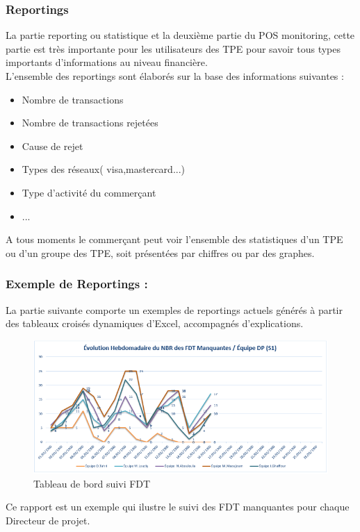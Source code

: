 \subsubsection{Reportings}
La partie reporting ou statistique et la deuxième partie du POS monitoring, cette partie est très importante pour les utilisateurs des TPE pour savoir tous types importants d'informations au niveau financière.\\

L’ensemble des reportings sont élaborés sur la base des informations suivantes :
\begin{itemize}[label=\textbullet]
\item Nombre de transactions 
\item Nombre de transactions rejetées
\item Cause de rejet 
\item Types des réseaux( visa,mastercard...)
\item Type d'activité du commerçant
\item ...
\end{itemize}


A tous moments le commerçant peut voir l'ensemble des statistiques d'un TPE ou d'un groupe des TPE, soit présentées par chiffres ou par des graphes.\\

\begin{figure}[h!]  
\end{figure}


\subsubsection*{Exemple de Reportings :}
La partie suivante comporte un exemples de reportings actuels générés à partir des tableaux croisés dynamiques d’Excel, accompagnés d’explications.

\begin{figure}[h!]  
  \centering
    \includegraphics[width=1\textwidth]{chapitre2/Figures/exemple1.png}
  \caption{Tableau de bord suivi FDT}
\end{figure}
Ce rapport est un exemple qui ilustre le suivi des FDT manquantes pour chaque Directeur de projet.




